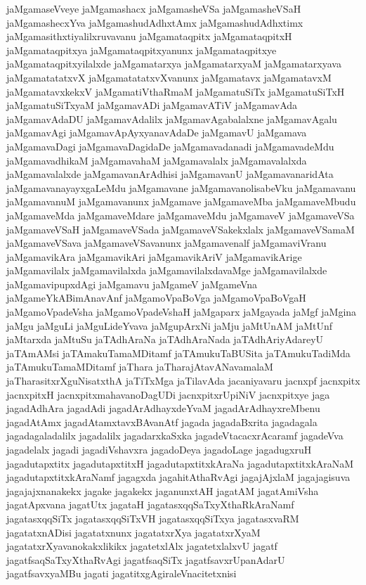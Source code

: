 {jaMgamaseVveye
jaMgamashacx
jaMgamasheVSa
jaMgamasheVSaH
jaMgamashecxYva
jaMgamashudAdhxtAmx
jaMgamashudAdhxtimx
jaMgamasithxtiyalilxruvavanu
jaMgamataqpitx
jaMgamataqpitxH
jaMgamataqpitxya
jaMgamataqpitxyanunx
jaMgamataqpitxye
jaMgamataqpitxyilalxde
jaMgamatarxya
jaMgamatarxyaM
jaMgamatarxyava
jaMgamatatatxvX
jaMgamatatatxvXvanunx
jaMgamatavx
jaMgamatavxM
jaMgamatavxkekxV
jaMgamatiVthaRmaM
jaMgamatuSiTx
jaMgamatuSiTxH
jaMgamatuSiTxyaM
jaMgamavADi
jaMgamavATiV
jaMgamavAda
jaMgamavAdaDU
jaMgamavAdalilx
jaMgamavAgabalalxne
jaMgamavAgalu
jaMgamavAgi
jaMgamavApAyxyanavAdaDe
jaMgamavU
jaMgamava
jaMgamavaDagi
jaMgamavaDagidaDe
jaMgamavadanadi
jaMgamavadeMdu
jaMgamavadhikaM
jaMgamavahaM
jaMgamavalalx
jaMgamavalalxda
jaMgamavalalxde
jaMgamavanArAdhisi
jaMgamavanU
jaMgamavanaridAta
jaMgamavanayayxgaLeMdu
jaMgamavane
jaMgamavanolisabeVku
jaMgamavanu
jaMgamavanuM
jaMgamavanunx
jaMgamave
jaMgamaveMba
jaMgamaveMbudu
jaMgamaveMda
jaMgamaveMdare
jaMgamaveMdu
jaMgamaveV
jaMgamaveVSa
jaMgamaveVSaH
jaMgamaveVSada
jaMgamaveVSakekxlalx
jaMgamaveVSamaM
jaMgamaveVSava
jaMgamaveVSavanunx
jaMgamavenalf
jaMgamaviVranu
jaMgamavikAra
jaMgamavikAri
jaMgamavikAriV
jaMgamavikArige
jaMgamavilalx
jaMgamavilalxda
jaMgamavilalxdavaMge
jaMgamavilalxde
jaMgamavipupxdAgi
jaMgamavu
jaMgameV
jaMgameVna
jaMgameYkABimAnavAnf
jaMgamoVpaBoVga
jaMgamoVpaBoVgaH
jaMgamoVpadeVsha
jaMgamoVpadeVshaH
jaMgaparx
jaMgayada
jaMgf
jaMgina
jaMgu
jaMguLi
jaMguLideYvava
jaMgupArxNi
jaMju
jaMtUnAM
jaMtUnf
jaMtarxda
jaMtuSu
jaTAdhAraNa
jaTAdhAraNada
jaTAdhAriyAdareyU
jaTAmAMsi
jaTAmakuTamaMDitamf
jaTAmukuTaBUSita
jaTAmukuTadiMda
jaTAmukuTamaMDitamf
jaThara
jaTharajAtavANavamalaM
jaTharasitxrXguNisatxthA
jaTiTxMga
jaTilavAda
jacaniyavaru
jacnxpf
jacnxpitx
jacnxpitxH
jacnxpitxmahavanoDagUDi
jacnxpitxrUpiNiV
jacnxpitxye
jaga
jagadAdhAra
jagadAdi
jagadArAdhayxdeYvaM
jagadArAdhayxreMbenu
jagadAtAmx
jagadAtamxtavxBAvanAtf
jagada
jagadaBxrita
jagadagala
jagadagaladalilx
jagadalilx
jagadarxkaSxka
jagadeVtacacxrAcaramf
jagadeVva
jagadelalx
jagadi
jagadiVshavxra
jagadoDeya
jagadoLage
jagadugxruH
jagadutapxtitx
jagadutapxtitxH
jagadutapxtitxkAraNa
jagadutapxtitxkAraNaM
jagadutapxtitxkAraNamf
jagagxda
jagahitAthaRvAgi
jagajAjxlaM
jagajagisuva
jagajajxnanakekx
jagake
jagakekx
jaganunxtAH
jagatAM
jagatAmiVsha
jagatApxvana
jagatUtx
jagataH
jagatasxqqSaTxyXthaRkAraNamf
jagatasxqqSiTx
jagatasxqqSiTxVH
jagatasxqqSiTxya
jagatasxvaRM
jagatatxnADisi
jagatatxnunx
jagatatxrXya
jagatatxrXyaM
jagatatxrXyavanokakxlikikx
jagatetxlAlx
jagatetxlalxvU
jagatf
jagatfsaqSaTxyXthaRvAgi
jagatfsaqSiTx
jagatfsavxrUpanAdarU
jagatfsavxyaMBu
jagati
jagatitxgAgiraleVnacitetxnisi
}
